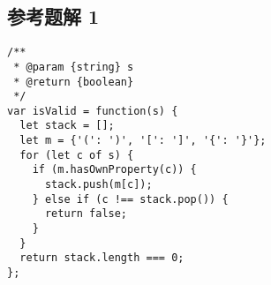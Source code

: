 \subsection{参考题解 1}

\begin{verbatim}
/**
 * @param {string} s
 * @return {boolean}
 */
var isValid = function(s) {
  let stack = [];
  let m = {'(': ')', '[': ']', '{': '}'};
  for (let c of s) {
    if (m.hasOwnProperty(c)) {
      stack.push(m[c]);
    } else if (c !== stack.pop()) {
      return false;
    }
  }
  return stack.length === 0;
};
\end{verbatim}
